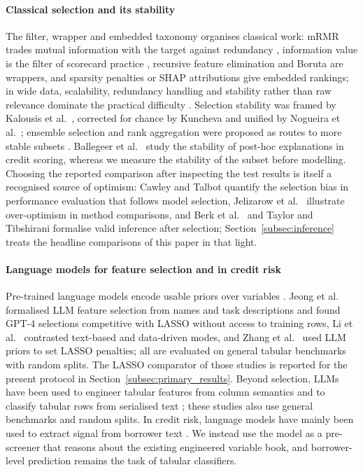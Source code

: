 \documentclass[final,5p,twocolumn]{elsarticle}
\begin{document}
\paragraph{Classical selection and its stability}
The filter, wrapper and embedded taxonomy \cite{kohavi1997,guyon2003} organises classical work: mRMR trades mutual information with the target against redundancy \cite{peng2005}, information value is the filter of scorecard practice \cite{siddiqi2006}, recursive feature elimination \cite{guyon2002} and Boruta \cite{kursa2010,breiman2001} are wrappers, and sparsity penalties \cite{tibshirani1996} or SHAP attributions \cite{lundberg2017} give embedded rankings; in wide data, scalability, redundancy handling and stability rather than raw relevance dominate the practical difficulty \cite{boloncanedo2015}. Selection stability was framed by Kalousis et al.\ \cite{kalousis2007}, corrected for chance by Kuncheva \cite{kuncheva2007} and unified by Nogueira et al.\ \cite{nogueira2018}; ensemble selection and rank aggregation were proposed as routes to more stable subsets \cite{saeys2008,dwork2001}. Ballegeer et al.\ \cite{ballegeer2025} study the stability of post-hoc explanations in credit scoring, whereas we measure the stability of the subset before modelling. Choosing the reported comparison after inspecting the test results is itself a recognised source of optimism: Cawley and Talbot \cite{cawley2010} quantify the selection bias in performance evaluation that follows model selection, Jelizarow et al.\ \cite{jelizarow2010} illustrate over-optimism in method comparisons, and Berk et al.\ \cite{berk2013} and Taylor and Tibshirani \cite{taylor2015} formalise valid inference after selection; Section~\ref{subsec:inference} treats the headline comparisons of this paper in that light.

\paragraph{Language models for feature selection and in credit risk}
Pre-trained language models encode usable priors over variables \cite{choi2022}. Jeong et al.\ \cite{jeong2025} formalised LLM feature selection from names and task descriptions and found GPT-4 selections competitive with LASSO without access to training rows, Li et al.\ \cite{li2025sigkdd} contrasted text-based and data-driven modes, and Zhang et al.\ \cite{zhang2025llmlasso} used LLM priors to set LASSO penalties; all are evaluated on general tabular benchmarks with random splits. The LASSO comparator of those studies is reported for the present protocol in Section~\ref{subsec:primary_results}. Beyond selection, LLMs have been used to engineer tabular features from column semantics \cite{hollmann2023caafe,han2024llmfe,nam2024octree} and to classify tabular rows from serialised text \cite{hegselmann2023tabllm}; these studies also use general benchmarks and random splits. In credit risk, language models have mainly been used to extract signal from borrower text \cite{sanzguerrero2025,xia2025}. We instead use the model as a pre-screener that reasons about the existing engineered variable book, and borrower-level prediction remains the task of tabular classifiers.
\end{document}
